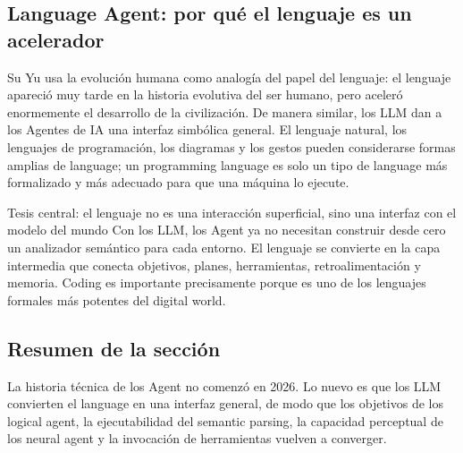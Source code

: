 \subsection{Language Agent: por qué el lenguaje es un acelerador}

Su Yu usa la evolución humana como analogía del papel del lenguaje: el lenguaje apareció muy tarde en la historia evolutiva del ser humano, pero aceleró enormemente el desarrollo de la civilización. De manera similar, los LLM dan a los Agentes de IA una interfaz simbólica general. El lenguaje natural, los lenguajes de programación, los diagramas y los gestos pueden considerarse formas amplias de language; un programming language es solo un tipo de language más formalizado y más adecuado para que una máquina lo ejecute.

\begin{importantbox}{Tesis central: el lenguaje no es una interacción superficial, sino una interfaz con el modelo del mundo}
Con los LLM, los Agent ya no necesitan construir desde cero un analizador semántico para cada entorno. El lenguaje se convierte en la capa intermedia que conecta objetivos, planes, herramientas, retroalimentación y memoria. Coding es importante precisamente porque es uno de los lenguajes formales más potentes del digital world.
\end{importantbox}

\subsection{Resumen de la sección}

La historia técnica de los Agent no comenzó en 2026. Lo nuevo es que los LLM convierten el language en una interfaz general, de modo que los objetivos de los logical agent, la ejecutabilidad del semantic parsing, la capacidad perceptual de los neural agent y la invocación de herramientas vuelven a converger.
